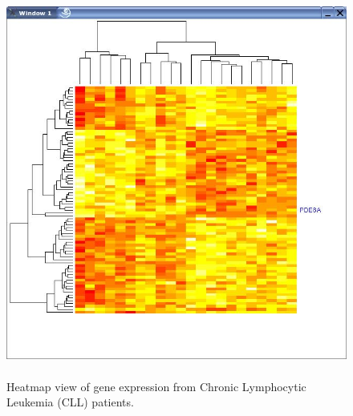 \documentclass[11pt]{article}
\begin{document}
\begin{figure}[ht]
  \begin{center}
    \includegraphics[height=5in, width=5in]{heatmap.jpg}
    \caption{ Heatmap view of gene expression from Chronic Lymphocytic
      Leukemia (CLL) patients. }
    \label{Fig:heatmap}
  \end{center}
\end{figure}
\end{document}

